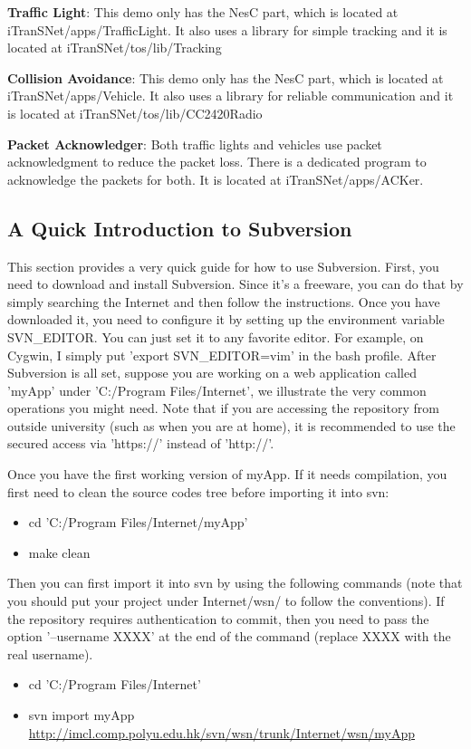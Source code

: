 \textbf{Traffic Light}: This demo only has the NesC part, which is located at iTranSNet/apps/TrafficLight. It also uses a library for simple tracking and it is located at iTranSNet/tos/lib/Tracking

\textbf{Collision Avoidance}: This demo only has the NesC part, which is located at iTranSNet/apps/Vehicle. It also uses a library for reliable communication and it is located at iTranSNet/tos/lib/CC2420Radio

\textbf{Packet Acknowledger}: Both traffic lights and vehicles use packet acknowledgment to reduce the packet loss. There is a dedicated program to acknowledge the packets for both. It is located at iTranSNet/apps/ACKer.

\subsection{A Quick Introduction to Subversion}
\label{sec:svn}
This section provides a very quick guide for how to use Subversion. First, you need to download and install Subversion. Since it's a freeware, you can do that by simply searching the Internet and then follow the instructions. Once you have downloaded it,  you need to configure it by setting up the environment variable SVN\_EDITOR. You can just set it to any favorite editor. For example, on Cygwin, I simply put 'export SVN\_EDITOR=vim' in the bash profile. After Subversion is all set, suppose you are working on a web application called 'myApp' under 'C:/Program Files/Internet', we illustrate the very common operations you might need. Note that if you are accessing the repository from outside university (such as when you are at home), it is recommended to use the secured access via 'https://' instead of 'http://'.

Once you have the first working version of myApp. If it needs compilation, you first need to clean the source codes tree before importing it into svn:
\begin{itemize}
\item cd 'C:/Program Files/Internet/myApp'
\item make clean
\end{itemize}

Then you can first import it into svn by using the following commands (note that you should put your project under Internet/wsn/ to follow the conventions). If the repository requires authentication to commit, then you need to pass the option '--username XXXX' at the end of the command (replace XXXX with the real username).
\begin{itemize}
\item cd 'C:/Program Files/Internet'
\item svn import myApp \url{http://imcl.comp.polyu.edu.hk/svn/wsn/trunk/Internet/wsn/myApp}
\end{itemize}

